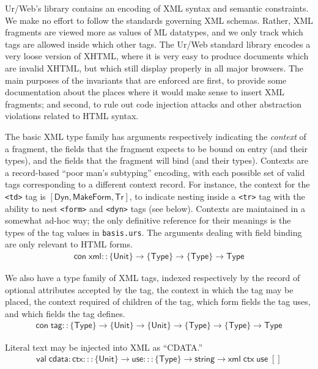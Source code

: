 \documentclass{article}
\newcommand{\mt}[1]{\mathsf{#1}}
\begin{document}
Ur/Web's library contains an encoding of XML syntax and semantic constraints.  We make no effort to follow the standards governing XML schemas.  Rather, XML fragments are viewed more as values of ML datatypes, and we only track which tags are allowed inside which other tags.  The Ur/Web standard library encodes a very loose version of XHTML, where it is very easy to produce documents which are invalid XHTML, but which still display properly in all major browsers.  The main purposes of the invariants that are enforced are first, to provide some documentation about the places where it would make sense to insert XML fragments; and second, to rule out code injection attacks and other abstraction violations related to HTML syntax.

The basic XML type family has arguments respectively indicating the \emph{context} of a fragment, the fields that the fragment expects to be bound on entry (and their types), and the fields that the fragment will bind (and their types).  Contexts are a record-based ``poor man's subtyping'' encoding, with each possible set of valid tags corresponding to a different context record.  For instance, the context for the \texttt{<td>} tag is $[\mt{Dyn}, \mt{MakeForm}, \mt{Tr}]$, to indicate nesting inside a \texttt{<tr>} tag with the ability to nest \texttt{<form>} and \texttt{<dyn>} tags (see below).  Contexts are maintained in a somewhat ad-hoc way; the only definitive reference for their meanings is the types of the tag values in \texttt{basis.urs}.  The arguments dealing with field binding are only relevant to HTML forms.
$$\begin{array}{l}
  \mt{con} \; \mt{xml} :: \{\mt{Unit}\} \to \{\mt{Type}\} \to \{\mt{Type}\} \to \mt{Type}
\end{array}$$

We also have a type family of XML tags, indexed respectively by the record of optional attributes accepted by the tag, the context in which the tag may be placed, the context required of children of the tag, which form fields the tag uses, and which fields the tag defines.
$$\begin{array}{l}
  \mt{con} \; \mt{tag} :: \{\mt{Type}\} \to \{\mt{Unit}\} \to \{\mt{Unit}\} \to \{\mt{Type}\} \to \{\mt{Type}\} \to \mt{Type}
\end{array}$$

Literal text may be injected into XML as ``CDATA.''
$$\begin{array}{l}
  \mt{val} \; \mt{cdata} : \mt{ctx} ::: \{\mt{Unit}\} \to \mt{use} ::: \{\mt{Type}\} \to \mt{string} \to \mt{xml} \; \mt{ctx} \; \mt{use} \; []
\end{array}$$
\end{document}
